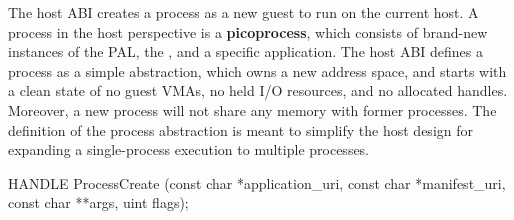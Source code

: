 



\label{sec:abi:proc}


The host ABI creates a process as a new guest to run on the current host.
A process in the host perspective is a {\bf picoprocess}, which consists of brand-new instances
of the PAL, the \libos{}, and a specific application.
The host ABI defines a process
as a simple abstraction, which owns a new address space, and starts with a clean state of no guest VMAs, no held I/O resources, and no allocated handles.
Moreover, a new process will not share any memory with former processes.
The definition of the process abstraction
is meant to simplify the host design for expanding a single-process execution to multiple processes.








\begin{paldef}
HANDLE ProcessCreate (const char *application_uri,
                      const char *manifest_uri,
                      const char **args, uint flags);
\end{paldef}


